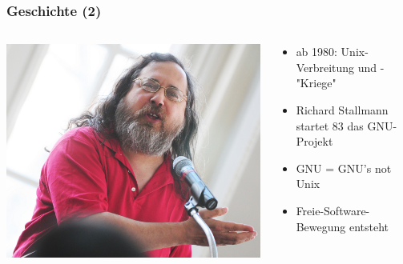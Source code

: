 \documentclass[12pt]{beamer}
\begin{document}
\begin{frame}

	\frametitle{Geschichte (2)}

	\begin{columns}
		\begin{column}{0.3\textwidth}
			\centerline{\includegraphics[scale=0.5]{src/img/rms}}
		\end{column}

		\begin{column}{0.7\textwidth}
			\begin{itemize}
				\item ab 1980: Unix-Verbreitung und -"Kriege"
				\item Richard Stallmann startet 83 das GNU-Projekt
				\item GNU = GNU's not Unix
				\item Freie-Software-Bewegung entsteht
			\end{itemize}
		\end{column}
	\end{columns}
\end{frame}
\end{document}
